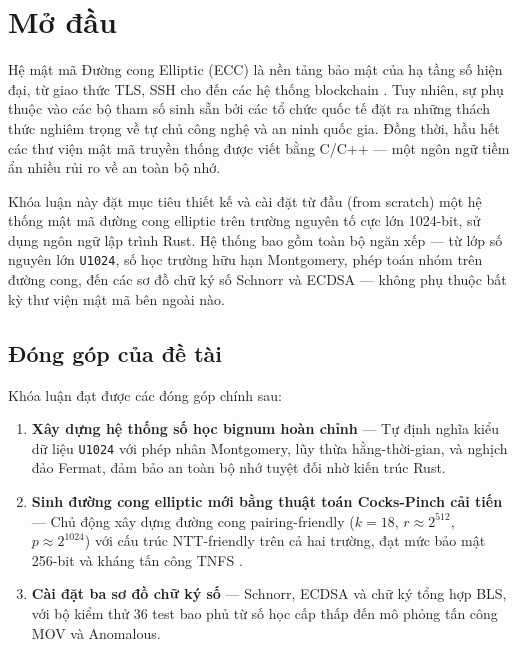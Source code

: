 
\clearpage
{}

\chapter*{Mở đầu}

Hệ mật mã Đường cong Elliptic (ECC) là nền tảng bảo mật của hạ tầng số
hiện đại, từ giao thức TLS, SSH cho đến các hệ thống blockchain
\citep{DiffieHellman1976, Rosing2024}. Tuy nhiên, sự phụ thuộc vào các
bộ tham số sinh sẵn bởi các tổ chức quốc tế đặt ra những thách thức
nghiêm trọng về tự chủ công nghệ và an ninh quốc gia. Đồng thời, hầu hết
các thư viện mật mã truyền thống được viết bằng C/C++ --- một ngôn ngữ
tiềm ẩn nhiều rủi ro về an toàn bộ nhớ.

Khóa luận này đặt mục tiêu thiết kế và cài đặt từ đầu (from scratch) một
hệ thống mật mã đường cong elliptic trên trường nguyên tố cực lớn
1024-bit, sử dụng ngôn ngữ lập trình Rust. Hệ thống bao gồm toàn bộ ngăn
xếp --- từ lớp số nguyên lớn \texttt{U1024}, số học trường hữu hạn
Montgomery, phép toán nhóm trên đường cong, đến các sơ đồ chữ ký số
Schnorr và ECDSA --- không phụ thuộc bất kỳ thư viện mật mã bên ngoài
nào.

\section{Đóng góp của đề
tài}\label{ux111uxf3ng-guxf3p-cux1ee7a-ux111ux1ec1-tuxe0i}

Khóa luận đạt được các đóng góp chính sau:

\begin{enumerate}
\def\labelenumi{\arabic{enumi}.}
\tightlist
\item
  \textbf{Xây dựng hệ thống số học bignum hoàn chỉnh} --- Tự định nghĩa
  kiểu dữ liệu \texttt{U1024} với phép nhân Montgomery, lũy thừa
  hằng-thời-gian, và nghịch đảo Fermat, đảm bảo an toàn bộ nhớ tuyệt đối
  nhờ kiến trúc Rust.
\item
  \textbf{Sinh đường cong elliptic mới bằng thuật toán Cocks-Pinch cải
  tiến} --- Chủ động xây dựng đường cong pairing-friendly (\(k = 18\),
  \(r \approx 2^{512}\), \(p \approx 2^{1024}\)) với cấu trúc
  NTT-friendly trên cả hai trường, đạt mức bảo mật 256-bit và kháng tấn
  công TNFS \citep{CocksPinch2001, BarbulescuDuquesne2019}.
\item
  \textbf{Cài đặt ba sơ đồ chữ ký số} --- Schnorr, ECDSA và chữ ký tổng
  hợp BLS, với bộ kiểm thử 36 test bao phủ từ số học cấp thấp đến mô
  phỏng tấn công MOV và Anomalous.
\end{enumerate}

